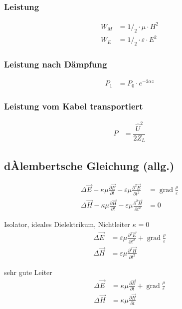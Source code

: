 \subsubsection{Leistung}

\begin{align*}
    W_{M} & = 1/_2\cdot\mu\cdot H^2         \\
    W_{E} & = 1/_2\cdot\varepsilon\cdot E^2
\end{align*}

\subsubsection{Leistung nach Dämpfung}

\begin{align*}
    P_1 & = P_0 \cdot e^{-2\alpha z}
\end{align*}

\subsubsection{Leistung vom Kabel transportiert}

\begin{align*}
    P & = \dfrac{\hat{U}^2}{2 Z_L}
\end{align*}

\subsection{dÀlembertsche Gleichung (allg.)}
\begin{align*}
    \Delta \vec{E}-\kappa \mu \frac{\partial \vec{E}}{\partial t}-\varepsilon \mu \frac{\partial^{2} \vec{E}}{\partial t^{2}} & = \operatorname{grad} \frac{\rho}{\varepsilon} \\
    \Delta \vec{H}-\kappa \mu \frac{\partial \vec{H}}{\partial t}-\varepsilon \mu \frac{\partial^{2} \vec{H}}{\partial t^{2}} & = 0
\end{align*}

Isolator, ideales Dielektrikum, Nichtleiter $\kappa = 0$
\begin{align*}
    \Delta \vec{E} & =\varepsilon \mu \frac{\partial^{2} \vec{E}}{\partial t^{2}}+\operatorname{grad} \frac{\rho}{\varepsilon} \\
    \Delta \vec{H} & =\varepsilon \mu \frac{\partial^{2} \vec{H}}{\partial t^{2}}
\end{align*}

sehr gute Leiter
\begin{align*}
    \Delta \vec{E} & =\kappa \mu \frac{\partial \vec{E}}{\partial t}+\operatorname{grad} \frac{\rho}{\varepsilon} \\
    \Delta \vec{H} & =\kappa \mu \frac{\partial \vec{H}}{\partial t}
\end{align*}

